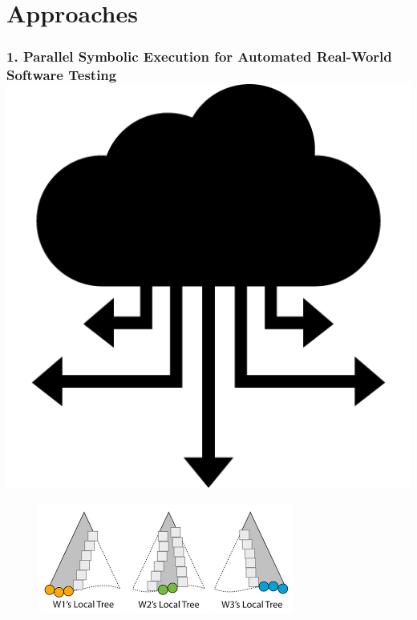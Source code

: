 \documentclass{beamer}
\begin{document}
	\section{Approaches}
	
	
	
	\begin{frame}
		\frametitle{1. Parallel Symbolic Execution for Automated Real-World Software Testing \cite{base3} \includegraphics[scale=0.025]{distributed}}
		
		\begin{figure}[htbp]
			\centering
			\includegraphics[scale=0.5]{cloud9}
		\end{figure}
		

\end{frame}
\end{document}
